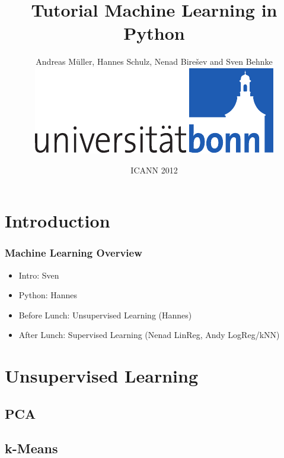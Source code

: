 \documentclass[english,final,compress]{beamer}
\title{Tutorial Machine Learning in Python}
\author{Andreas M\"{u}ller, Hannes Schulz, Nenad Bire\v sev and Sven 
    Behnke\\[5mm]\includegraphics[width=.2\linewidth]{style/Logo_UBo_h24_4c-crop}}
\date{ICANN 2012}
\renewcommand\maketitle{\frame[plain]{\titlepage}\addtocounter{framenumber}{-1}}
\begin{document}
\maketitle


\newcommand\fenc{f_{\mathrm{enc}}}
\newcommand\fdec{f_{\mathrm{dec}}}
\newcommand\Wand{\ensuremath{W_{\mathbf{and}}}}
\newcommand\Wor{\ensuremath{W_{\mathbf{or}}}}
\newcommand{\w}[1]{\ensuremath{\mathbf{#1}}}
\newcommand\loss{\ell}

\section{Introduction}

\begin{frame}
    \frametitle{Machine Learning Overview}
    \begin{itemize}
        \item Intro: Sven
        \item Python: Hannes
        \item Before Lunch: Unsupervised Learning (Hannes)
        \item After Lunch: Supervised Learning (Nenad LinReg, Andy LogReg/kNN)
    \end{itemize}
\end{frame}

\section{Unsupervised Learning}

\subsection{PCA}



\subsection{k-Means}
\end{document}
